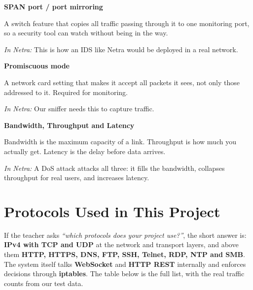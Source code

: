 \documentclass[11pt,a4paper]{article}
\newcommand{\term}[3]{%
  \par\medskip\noindent\textbf{\color{ink}#1}\par
  \nobreak\vspace{1pt}#2\par
  \nobreak\vspace{1pt}\textit{\color{accent}In Netra:} #3\par}
\begin{document}
\term{SPAN port / port mirroring}
{A switch feature that copies all traffic passing through it to one monitoring
port, so a security tool can watch without being in the way.}
{This is how an IDS like Netra would be deployed in a real network.}

\term{Promiscuous mode}
{A network card setting that makes it accept all packets it sees, not only those
addressed to it. Required for monitoring.}
{Our sniffer needs this to capture traffic.}

\term{Bandwidth, Throughput and Latency}
{Bandwidth is the maximum capacity of a link. Throughput is how much you actually
get. Latency is the delay before data arrives.}
{A DoS attack attacks all three: it fills the bandwidth, collapses throughput for
real users, and increases latency.}

\section{Protocols Used in This Project}

\begin{saybox}
If the teacher asks \textit{``which protocols does your project use?''}, the short
answer is: \textbf{IPv4 with TCP and UDP} at the network and transport layers,
and above them \textbf{HTTP, HTTPS, DNS, FTP, SSH, Telnet, RDP, NTP and SMB}.
The system itself talks \textbf{WebSocket} and \textbf{HTTP REST} internally and
enforces decisions through \textbf{iptables}. The table below is the full list,
with the real traffic counts from our test data.
\end{saybox}
\end{document}
